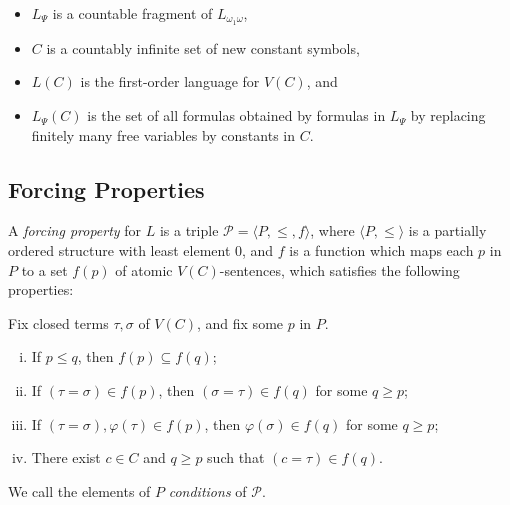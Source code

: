 \documentclass{scrartcl}
\renewcommand{\phi}{\varphi}
\newcommand{\SP}{\mathscr{P}}
\begin{document}
\begin{itemize}
\item
$L_\Psi$ is a countable fragment of $L_{\omega_1\omega}$,
\item
$C$ is a countably infinite set of new constant symbols,
\item
$L(C)$ is the first-order language for $V(C)$, and
\item
$L_\Psi(C)$ is the set of all formulas obtained by formulas in $L_\Psi$ by replacing finitely many free variables by constants in $C$.
\end{itemize}

\subsection{Forcing Properties}

\begin{definition}
\label{D:forcing property}
A \emph{forcing property} for $L$ is a triple $\SP = \langle P, \le, f \rangle$, where $\langle P, \le \rangle$ is a partially ordered structure with least element $0$, and $f$ is a function which maps each $p$ in $P$ to a set $f(p)$ of atomic $V(C)$-sentences, which satisfies the following properties:

Fix closed terms $\tau, \sigma$ of $V(C)$, and fix some $p$ in $P$.
\begin{enumerate}[i)]
\item If $p\le q$, then $f(p)\subseteq f(q)$;
\item If $(\tau = \sigma) \in f(p)$, then $(\sigma = \tau) \in f(q)$ for some $q\ge p$;
\item If $(\tau = \sigma), \phi(\tau) \in f(p)$, then $\phi(\sigma) \in f(q)$ for some $q\ge p$;
\item There exist $c\in C$ and $q\ge p$ such that $(c = \tau) \in f(q)$.
\end{enumerate}
We call the elements of $P$ \emph{conditions} of $\SP$.
\end{definition}
\end{document}
